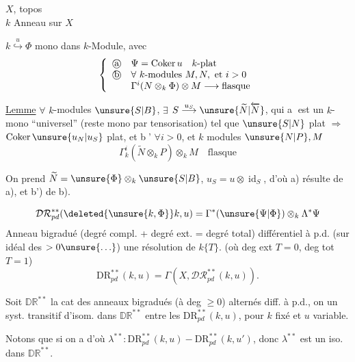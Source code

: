 $X$, topos\\
$k$ Anneau sur $X$

$k\overset{u}{\hookrightarrow}\Phi$ mono dans $k$-Module, avec
\[
\left\{\begin{array}{ll}
\text{\textcircled{a}}&\Psi=\operatorname{Coker}u\quad k\text{-plat}\\
\text{\textcircled{b}}&\forall\ k\text{-modules }M,N,\text{ et }i>0\\
&\Gamma^i(N\otimes_k\Phi)\otimes M\longrightarrow\text{flasque}
\end{array}\right.
\]

\uline{Lemme} $\forall$ $k$-modules $\unsure{S|B}$, $\exists$  $S\overset{u_S}{\longrightarrow}\unsure{\widetilde N|\overleftarrow N}$, qui \textcircled{a} est un $k$-mono ``universel'' (reste mono par tensorisation) tel que $\unsure{S|N}$ plat $\Rightarrow$ $\operatorname{Coker}\unsure{u_N|u_S}$ plat, et \textcircled{b'} $\forall i>0$, et $k$ modules $\unsure{N|P},M$
\[
\Gamma_k^i(\widetilde N\otimes_k P)\otimes_k M\quad\text{flasque}
\]


On prend $\widetilde N=\unsure{\Phi}\otimes_k\unsure{S|B}$, $u_S=u\otimes\operatorname{id}_S$, d'où a) résulte de a), et b') de b).

\[
\mathcal{DR}_{pd}^{**}(\deleted{\unsure{k,\Phi}}k,u)
=\Gamma^*(\unsure{\Psi|\Phi})\otimes_k\Lambda^*\Psi
\]
Anneau bigradué (degré compl. + degré ext. = degré total)
différentiel à p.d. (sur idéal des  $>0\unsure{\ldots}$) une résolution de $k\{T\}$. (où deg ext $T=0$, deg tot $T=1$)
\[
\mathrm{DR}_{pd}^{**}(k,u)=\Gamma(X,\mathcal{DR}_{pd}^{**}(k,u)).
\]

Soit $\mathbb{DR}^{**}$ la cat  des anneaux bigradués (à deg $\geq0$) alternés diff. à p.d.,  on  un syst. transitif d'isom. dans $\mathbb{DR}^{**}$ entre les $\mathrm{DR}_{pd}^{**}(k,u)$, pour $k$ fixé et $u$ variable.

Notons que si on a
d'où
$\lambda^{**}:\mathrm{DR}_{pd}^{**}(k,u)\mathbin{-}\mathrm{DR}_{pd}^{**}(k,u')$,
donc $\lambda^{**}$ est un iso. dans $\mathbb{DR}^{**}$.

